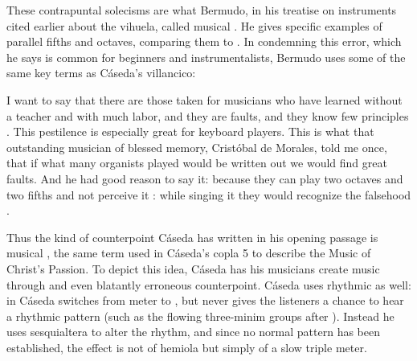 
These contrapuntal solecisms are what Bermudo, in his treatise on instruments
cited earlier about the vihuela, called musical .
He gives specific examples of parallel fifths and octaves, comparing them to
.
In condemning this error, which he says is common for beginners and
instrumentalists, Bermudo uses some of the same key terms as Cáseda's
villancico:
\begin{quoting}
    I want to say that there are those taken for musicians who have learned
    without a teacher and with much labor, and they are faults, and they know
    few principles .  
    This pestilence is especially great for keyboard players.  
    This is what that outstanding musician of blessed memory, Cristóbal de
    Morales, told me once, that if what many organists played would be written
    out we would find great faults.  
    And he had good reason to say it: because they can play two octaves and two
    fifths and not perceive it : while
    singing it they would recognize the falsehood .%
        \Autocite[]{Bermudo:Declaracion} 
\end{quoting}
Thus the kind of counterpoint Cáseda has written in his opening passage is
musical , the same term used in Cáseda's copla 5 to describe
the Music of Christ's Passion.
To depict this idea, Cáseda has his musicians create  music
through  and even blatantly erroneous counterpoint.
Cáseda uses rhythmic  as well: in  Cáseda
switches from \meterC{} meter to \meterCZ{}, but never gives the listeners
a chance to hear a  \meterCZ{} rhythmic pattern (such as the
flowing three-minim groups after ). 
Instead he uses sesquialtera to alter the rhythm, and since no normal
\meterCZ{} pattern has been established, the effect is not of hemiola but
simply of a slow triple meter.

